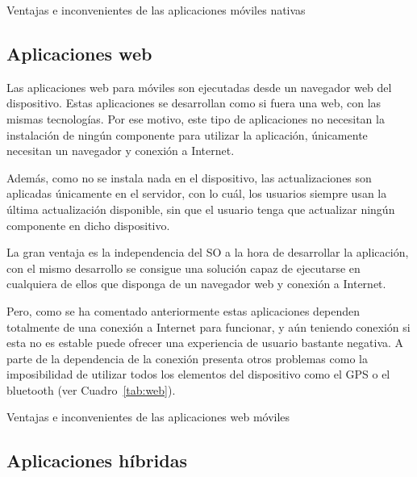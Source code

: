 \begin{table}[nativas]
	\centering
	{\small
		
	}
	\caption[Ventajas e inconvenientes de las aplicaciones móviles nativas]
	{Ventajas e inconvenientes de las aplicaciones móviles nativas~\cite{TIPAPP}}
	\label{tab:nativas}
\end{table}

\subsection{Aplicaciones web}
Las aplicaciones web para móviles son ejecutadas desde un navegador web del dispositivo. Estas aplicaciones se desarrollan
como si fuera una web, con las mismas tecnologías. Por ese motivo, este tipo de aplicaciones no necesitan la instalación 
de ningún componente para utilizar la aplicación, únicamente necesitan un navegador y conexión a Internet. 

Además, como no se instala nada en el dispositivo, las actualizaciones son aplicadas únicamente en el servidor, con lo cuál, 
los usuarios siempre usan la última actualización disponible, sin que el usuario tenga que actualizar ningún componente 
en dicho dispositivo.

La gran ventaja es la independencia del \acs{SO} a la hora de desarrollar la aplicación, con el mismo desarrollo se consigue 
una solución capaz de ejecutarse en cualquiera de ellos que disponga de un navegador web y conexión a Internet. 

Pero, como se ha comentado anteriormente estas aplicaciones dependen totalmente de una conexión a Internet para 
funcionar, y aún teniendo conexión si esta no es estable puede ofrecer una experiencia de usuario bastante negativa. A 
parte de la dependencia de la conexión presenta otros problemas como la imposibilidad de utilizar todos los elementos 
del dispositivo como el \acs{GPS} o el bluetooth (ver Cuadro~\ref{tab:web}).

\begin{table}[web]
	\centering
	{\small
		
	}
	\caption[Ventajas e inconvenientes de las aplicaciones web móviles]
	{Ventajas e inconvenientes de las aplicaciones web móviles~\cite{TIPAPP}}
	\label{tab:web}
\end{table}

\subsection{Aplicaciones híbridas}

